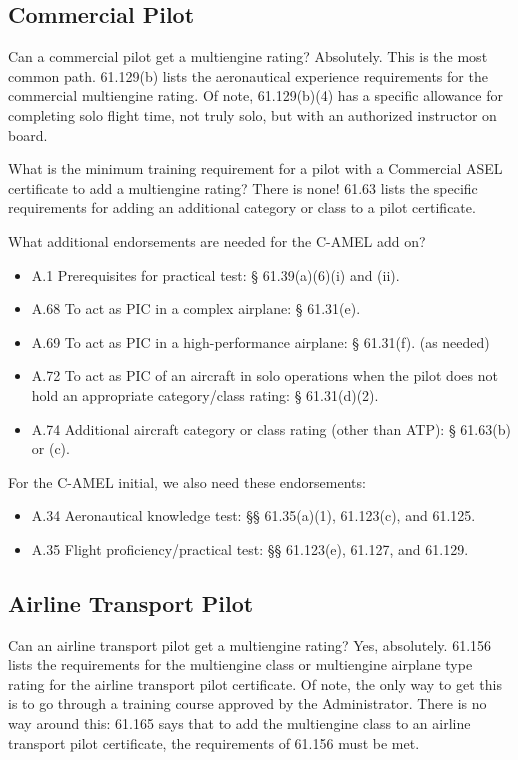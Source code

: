 \subsection{Commercial Pilot}

Can a commercial pilot get a multiengine rating? Absolutely. This is the most common path.
61.129(b) lists the aeronautical experience requirements for the commercial multiengine rating.
Of note, 61.129(b)(4) has a specific allowance for completing solo flight time, not truly solo, but
with an authorized instructor on board.

What is the minimum training requirement for a pilot with a Commercial ASEL certificate
to add a multiengine rating? There is none! 61.63 lists the specific requirements for adding an
additional category or class to a pilot certificate.

What additional endorsements are needed for the C-AMEL add on?

\begin{itemize}
\item A.1 Prerequisites for practical test: § 61.39(a)(6)(i) and (ii).
\item A.68 To act as PIC in a complex airplane: § 61.31(e).
\item A.69 To act as PIC in a high-performance airplane: § 61.31(f). (as needed)
\item A.72 To act as PIC of an aircraft in solo operations when the pilot does not hold an
appropriate category/class rating: § 61.31(d)(2).
\item A.74 Additional aircraft category or class rating (other than ATP): § 61.63(b) or (c).
\end{itemize}

For the C-AMEL initial, we also need these endorsements:

\begin{itemize}
\item A.34 Aeronautical knowledge test: §§ 61.35(a)(1), 61.123(c), and 61.125.
\item A.35 Flight proficiency/practical test: §§ 61.123(e), 61.127, and 61.129.
\end{itemize}

\subsection{Airline Transport Pilot}

Can an airline transport pilot get a multiengine rating? Yes, absolutely. 61.156 lists the requirements
for the multiengine class or multiengine airplane type rating for the airline transport pilot certificate.
Of note, the only way to get this is to go through a training course approved by the Administrator. There is
no way around this: 61.165 says that to add the multiengine class to an airline transport pilot certificate,
the requirements of 61.156 must be met.

